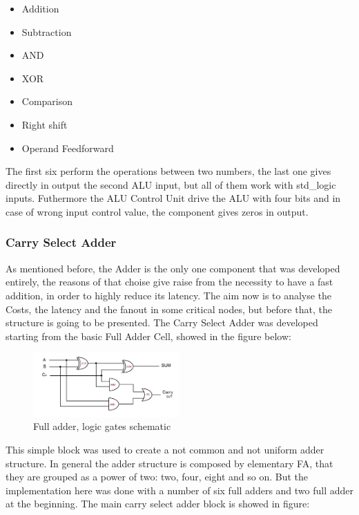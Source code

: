 \begin{itemize}
\item Addition
\item Subtraction
\item AND
\item XOR
\item Comparison
\item Right shift
\item Operand Feedforward
\end{itemize}
\noindent
The first six perform the operations between two numbers, the last one gives directly in output the second ALU input, but all of them work with std\_logic inputs. Futhermore the ALU Control Unit drive the ALU with four bits and in case of wrong input control value, the component gives zeros in output.
\newpage

\subsubsection{Carry Select Adder}
As mentioned before, the Adder is the only one component that was developed entirely, the reasons of that choise give raise from the necessity to have a fast addition, in order to highly reduce its latency. The aim now is to analyse the Costs, the latency and the fanout in some critical nodes, but before that, the structure is going to be presented. The Carry Select Adder was developed starting from the basic Full Adder Cell, showed in the figure below:

\begin{figure}[H]
	\centering
	\includegraphics[width=0.5\textwidth]{sec2/images/full_adder.png}
	\caption{Full adder, logic gates schematic}
	\label{fig:full_adder}
\end{figure}
\noindent
This simple block was used to create a not common and not uniform adder structure. In general the adder structure is composed by elementary FA, that they are grouped as a power of two: two, four, eight and so on. But the implementation here was done with a number of six full adders and two full adder at the beginning. The main carry select adder block is showed in figure:

